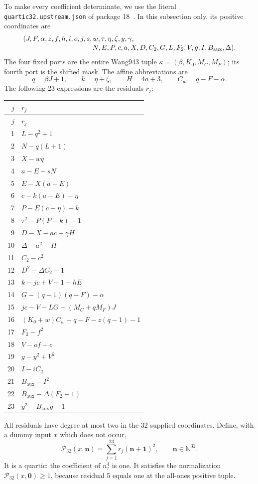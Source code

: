 To make every coefficient determinate, we use the literal
\texttt{quartic32.upstream.json} of package 18~\cite{p18}. In this subsection only,
its positive coordinates are
\begin{align*}
 &(J,F,\alpha,z,f,h,i,o,j,s,w,\tau,\eta,\zeta,y,\gamma,\\[-2pt]
 &\hspace{35mm}N,E,P,c,a,X,D,C_2,G,L,F_2,V,g,I,B_{\mathrm{aux}},\Delta).
\end{align*}
The four fixed ports are the entire Wang943 tuple
$\kappa=(\beta,K_0,M_C,M_F)$; its fourth port is the shifted mask.
The affine abbreviations are
\[
 q=\beta J+1,\qquad k=\eta+\zeta,\qquad H=4a+3,
 \qquad C_w=q-F-\alpha.
\]
The following 23 expressions are the residuals $r_j$:
\begin{center}
\small
\begin{longtable}{@{}r@{\quad}l@{}}
\toprule $j$&$r_j$\\\midrule
\endfirsthead
\toprule $j$&$r_j$\\\midrule
\endhead
1&$L-q^2+1$\\
2&$N-q(L+1)$\\
3&$X-wq$\\
4&$a-E-sN$\\
5&$E-X(a-E)$\\
6&$c-k(a-E)-\eta$\\
7&$P-E(c-\eta)-k$\\
8&$\tau^2-P(P-k)-1$\\
9&$D-X-ac-\gamma H$\\
10&$\Delta-a^2-H$\\
11&$C_2-c^2$\\
12&$D^2-\Delta C_2-1$\\
13&$k-jc+V-1-hE$\\
14&$G-(q-1)(q-F)-\alpha$\\
15&$jc-V-LG-(M_C+qM_F)J$\\
16&$(K_0+w)C_w+q-F-z(q-1)-1$\\
17&$F_2-f^2$\\
18&$V-of+c$\\
19&$g-y^2+V^2$\\
20&$I-iC_2$\\
21&$B_{\mathrm{aux}}-I^2$\\
22&$B_{\mathrm{aux}}-\Delta(F_2-1)$\\
23&$y^2-B_{\mathrm{aux}}g-1$\\
\bottomrule
\end{longtable}
\end{center}
All residuals have degree at most two in the 32 supplied coordinates.
Define, with a dummy input $x$ which does not occur,
\[
 \mathcal P_{32}(x,\mathbf n)=\sum_{j=1}^{23}r_j(\mathbf n+\mathbf1)^2,
 \qquad \mathbf n\in\mathbb N^{32}.
\]
It is a quartic: the coefficient of $n_\tau^4$ is one. It satisfies the
normalization $\mathcal P_{32}(x,\mathbf0)\ge1$, because residual 5 equals
one at the all-ones positive tuple.

